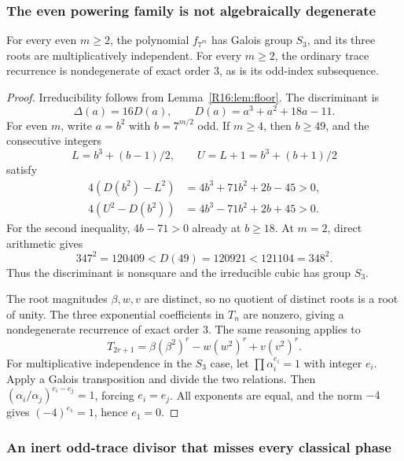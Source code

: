\documentclass[11pt,a4paper]{article}
\theoremstyle{definition}\newtheorem{definition}[theorem]{Definition}
\theoremstyle{remark}\newtheorem{remark}[theorem]{Remark}
\begin{document}
\subsubsection{The even powering family is not algebraically degenerate}

\begin{proposition}\label{R16:prop:S3}
For every even $m\ge2$, the polynomial $f_{7^m}$ has Galois group $S_3$,
and its three roots are multiplicatively independent. For every $m\ge2$,
the ordinary trace recurrence is nondegenerate of exact order $3$, as is
its odd-index subsequence.
\end{proposition}
\begin{proof}
Irreducibility follows from Lemma~\ref{R16:lem:floor}. The discriminant is
\[
 \Delta(a)=16D(a),\qquad D(a)=a^3+a^2+18a-11.
\]
For even $m$, write $a=b^2$ with $b=7^{m/2}$ odd. If $m\ge4$, then
$b\ge49$, and the consecutive integers
\[
 L=b^3+(b-1)/2,\qquad U=L+1=b^3+(b+1)/2
\]
satisfy
\begin{align*}
 4(D(b^2)-L^2)&=4b^3+71b^2+2b-45>0,\\
 4(U^2-D(b^2))&=4b^3-71b^2+2b+45>0.
\end{align*}
For the second inequality, $4b-71>0$ already at $b\ge18$.
At $m=2$, direct arithmetic gives
\[
 347^2=120409<D(49)=120921<121104=348^2.
\]
Thus the discriminant is nonsquare and the irreducible cubic has group
$S_3$.

The root magnitudes $\beta,w,v$ are distinct, so no quotient of distinct
roots is a root of unity. The three exponential coefficients in $T_n$
are nonzero, giving a nondegenerate recurrence of exact order $3$.
The same reasoning applies to
\[
 T_{2r+1}=\beta(\beta^2)^r-w(w^2)^r+v(v^2)^r.
\]
For multiplicative independence in the $S_3$ case, let
$\prod\alpha_i^{e_i}=1$ with integer $e_i$. Apply a Galois transposition
and divide the two relations. Then
$(\alpha_i/\alpha_j)^{e_i-e_j}=1$, forcing $e_i=e_j$. All exponents
are equal, and the norm $-4$ gives $(-4)^{e_1}=1$, hence $e_1=0$.
\end{proof}

\subsubsection{An inert odd-trace divisor that misses every classical phase}
\end{document}
